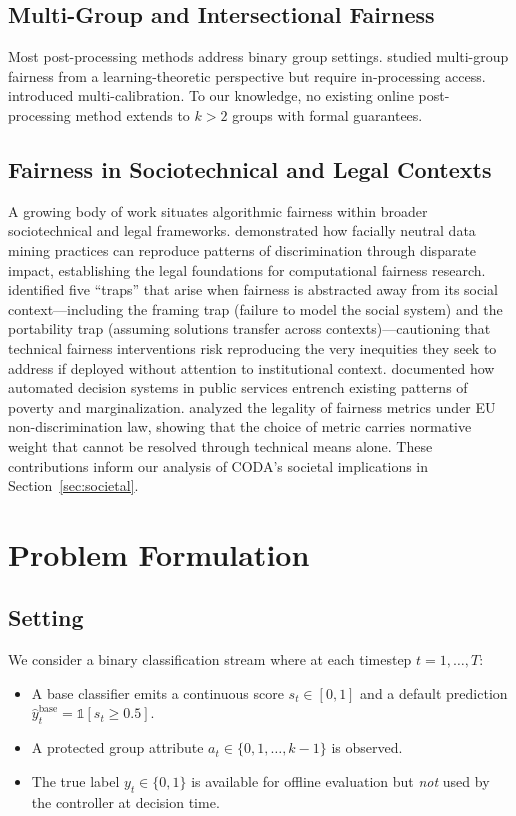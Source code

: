 \documentclass[letterpaper]{article} %
\theoremstyle{definition}
\begin{document}
\subsection{Multi-Group and Intersectional Fairness}
Most post-processing methods address binary group settings. \citet{kearns2018preventing} studied multi-group fairness from a learning-theoretic perspective but require in-processing access. \citet{hebert2018multicalibration} introduced multi-calibration. To our knowledge, no existing online post-processing method extends to $k > 2$ groups with formal guarantees.

\subsection{Fairness in Sociotechnical and Legal Contexts}
A growing body of work situates algorithmic fairness within broader sociotechnical and legal frameworks. \citet{barocas2016big} demonstrated how facially neutral data mining practices can reproduce patterns of discrimination through disparate impact, establishing the legal foundations for computational fairness research. \citet{selbst2019fairness} identified five ``traps'' that arise when fairness is abstracted away from its social context---including the framing trap (failure to model the social system) and the portability trap (assuming solutions transfer across contexts)---cautioning that technical fairness interventions risk reproducing the very inequities they seek to address if deployed without attention to institutional context. \citet{eubanks2018automating} documented how automated decision systems in public services entrench existing patterns of poverty and marginalization. \citet{wachter2021bias} analyzed the legality of fairness metrics under EU non-discrimination law, showing that the choice of metric carries normative weight that cannot be resolved through technical means alone. These contributions inform our analysis of CODA's societal implications in Section~\ref{sec:societal}.


\section{Problem Formulation}
\label{sec:problem}

\subsection{Setting}
We consider a binary classification stream where at each timestep $t = 1, \ldots, T$:
\begin{itemize}
    \item A base classifier emits a continuous score $s_t \in [0,1]$ and a default prediction $\hat{y}_t^{\text{base}} = \mathbb{1}[s_t \geq 0.5]$.
    \item A protected group attribute $a_t \in \{0, 1, \ldots, k{-}1\}$ is observed.
    \item The true label $y_t \in \{0,1\}$ is available for offline evaluation but \emph{not} used by the controller at decision time.
\end{itemize}
\end{document}

